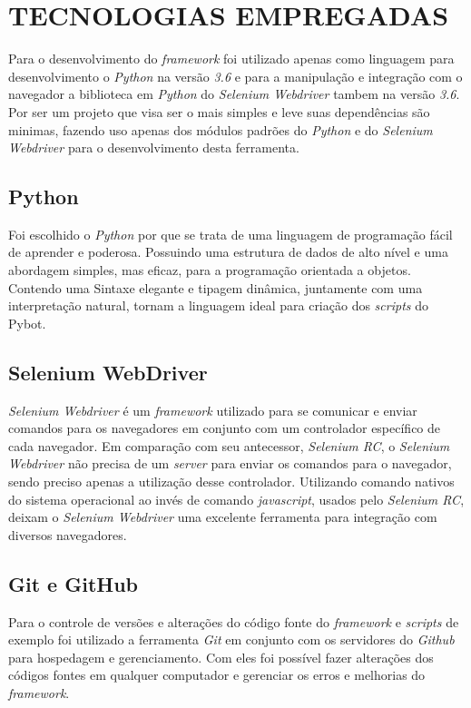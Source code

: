 %
%

\chapter{TECNOLOGIAS EMPREGADAS}\label{chap:tec}

        Para o desenvolvimento do \textit{framework} foi utilizado apenas como linguagem para desenvolvimento o \textit{Python} na versão \textit{3.6}
        e para a manipulação e integração com o navegador a biblioteca em \textit{Python} do \textit{Selenium Webdriver} tambem na versão \textit{3.6}.
        Por ser um projeto que visa ser o mais simples e leve suas dependências são minimas, fazendo uso apenas dos módulos padrões do \textit{Python}
        e do \textit{Selenium Webdriver} para o desenvolvimento desta ferramenta.

        \section{Python}

            Foi escolhido o \textit{Python} \cite{Python} por que se trata de uma linguagem de programação fácil de aprender e poderosa. Possuindo uma
            estrutura de dados de alto nível e uma abordagem simples, mas eficaz, para a programação orientada a objetos. Contendo uma Sintaxe elegante
            e tipagem dinâmica, juntamente com uma interpretação natural, tornam a linguagem ideal para criação dos \textit{scripts} do Pybot.

        \section{Selenium WebDriver}
        \label{webdriver}

            \textit{Selenium Webdriver} \cite{webdriver} é um \textit{framework} utilizado para se comunicar e enviar comandos para os navegadores em
            conjunto com um controlador específico de cada navegador. Em comparação com seu antecessor, \textit{Selenium RC}, o \textit{Selenium Webdriver}
            não precisa de um \textit{server} para enviar os comandos para o navegador, sendo preciso apenas a utilização desse controlador. Utilizando
            comando nativos do sistema operacional ao invés de comando \textit{javascript}, usados pelo \textit{Selenium RC}, deixam o \textit{Selenium Webdriver}
            uma excelente ferramenta para integração com diversos navegadores.

        \section{Git e GitHub}

            Para o controle de versões e alterações do código fonte do \textit{framework} e \textit{scripts} de exemplo foi utilizado a ferramenta
            \textit{Git} \cite{git} em conjunto com os servidores do \textit{Github} \cite{github} para hospedagem e gerenciamento. Com eles foi possível
            fazer alterações dos códigos fontes em qualquer computador e gerenciar os erros e melhorias do \textit{framework}.
